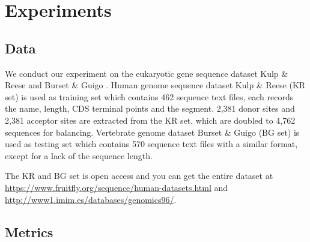 \documentclass[journal,twoside]{IEEEtran}
\begin{document}
\section{Experiments}\label{3}

\subsection{Data}\label{3.1}

We conduct our experiment on the eukaryotic gene sequence dataset Kulp \& Reese \cite{reese1997improved} and Burset \& Guigo \cite{burset1996evaluation}. Human genome sequence dataset Kulp \& Reese (KR set) is used as training set which contains 462 sequence text files, each records the name, length, CDS terminal points and the segment. 2,381 donor sites and 2,381 acceptor sites are extracted from the KR set, which are doubled to 4,762 sequences for balancing. Vertebrate genome dataset Burset \& Guigo (BG set) is used as testing set which contains 570 sequence text files with a similar format, except for a lack of the sequence length. 

The KR and BG set is open access and you can get the entire dataset at \url{https://www.fruitfly.org/sequence/human-datasets.html} and \url{http://www1.imim.es/databases/genomics96/}. 

\subsection{Metrics}\label{3.2}
\end{document}
